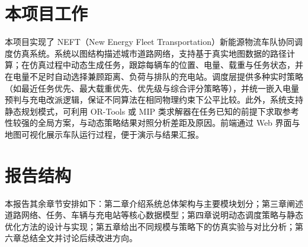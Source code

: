 \section{本项目工作}

本项目实现了 NEFT（New Energy Fleet Transportation）新能源物流车队协同调度仿真系统。系统以图结构描述城市道路网络，支持基于真实地图数据的路径计算；在仿真过程中动态生成任务，跟踪每辆车的位置、电量、载重与任务状态，并在电量不足时自动选择兼顾距离、负荷与排队的充电站。调度层提供多种实时策略（如最近任务优先、最大载重优先、优先级与综合评分策略等），并统一嵌入电量预判与充电改派逻辑，保证不同算法在相同物理约束下公平比较。此外，系统支持静态规划模式，可利用 OR-Tools 或 MIP 类求解器在任务已知的前提下求取参考性较强的全局方案，与动态策略结果对照分析差距及原因。前端通过 Web 界面与地图可视化展示车队运行过程，便于演示与结果汇报。

\section{报告结构}

本报告其余章节安排如下：第二章介绍系统总体架构与主要模块划分；第三章阐述道路网络、任务、车辆与充电站等核心数据模型；第四章说明动态调度策略与静态优化方法的设计与实现；第五章给出不同规模与策略下的仿真实验与对比分析；第六章总结全文并讨论后续改进方向。
